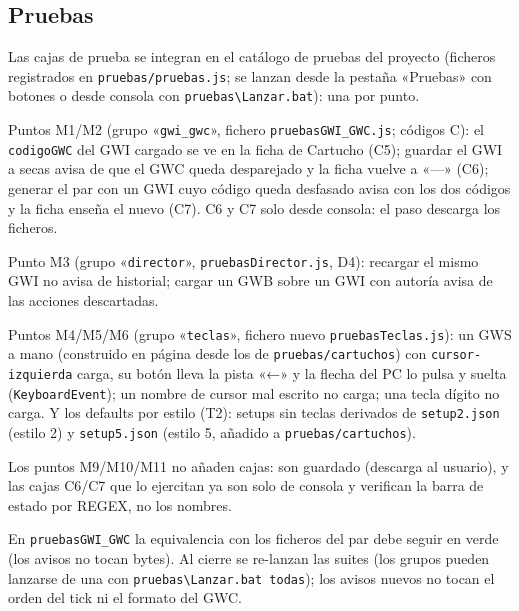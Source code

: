\subsection{Pruebas}
\label{sec:F5I17Pruebas}

Las cajas de prueba se integran en el catálogo de pruebas del proyecto (ficheros registrados en \texttt{pruebas/pruebas.js}; se lanzan desde la pestaña «Pruebas» con botones o desde consola con \texttt{pruebas\textbackslash Lanzar.bat}): una por punto.

Puntos M1/M2 (grupo «\texttt{gwi\_gwc}», fichero \texttt{pruebasGWI\_GWC.js}; códigos C): el \texttt{codigoGWC} del GWI cargado se ve en la ficha de Cartucho (C5); guardar el GWI a secas avisa de que el GWC queda desparejado y la ficha vuelve a «---» (C6); generar el par con un GWI cuyo código queda desfasado avisa con los dos códigos y la ficha enseña el nuevo (C7). C6 y C7 solo desde consola: el paso descarga los ficheros.

Punto M3 (grupo «\texttt{director}», \texttt{pruebasDirector.js}, D4): recargar el mismo GWI no avisa de historial; cargar un GWB sobre un GWI con autoría avisa de las acciones descartadas.

Puntos M4/M5/M6 (grupo «\texttt{teclas}», fichero nuevo \texttt{pruebasTeclas.js}): un GWS a mano (construido en página desde los de \texttt{pruebas/cartuchos}) con \texttt{cursor-izquierda} carga, su botón lleva la pista «←» y la flecha del PC lo pulsa y suelta (\texttt{KeyboardEvent}); un nombre de cursor mal escrito no carga; una tecla dígito no carga. Y los defaults por estilo (T2): setups sin teclas derivados de \texttt{setup2.json} (estilo 2) y \texttt{setup5.json} (estilo 5, añadido a \texttt{pruebas/cartuchos}).

Los puntos M9/M10/M11 no añaden cajas: son guardado (descarga al usuario), y las cajas C6/C7 que lo ejercitan ya son solo de consola y verifican la barra de estado por REGEX, no los nombres.

En \texttt{pruebasGWI\_GWC} la equivalencia con los ficheros del par debe seguir en verde (los avisos no tocan bytes). Al cierre se re-lanzan las suites (los grupos pueden lanzarse de una con \texttt{pruebas\textbackslash Lanzar.bat todas}); los avisos nuevos no tocan el orden del tick ni el formato del GWC.
